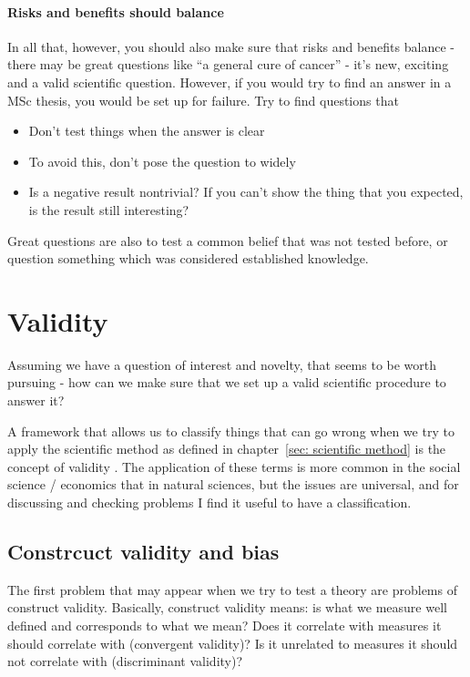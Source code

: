 \documentclass{tufte-book}
\begin{document}
\paragraph{Risks and benefits should balance} In all that, however, you should also make sure that risks and benefits balance - there may be great questions like ``a general cure of cancer'' - it's new, exciting and a valid scientific question. However, if you would try to find an answer in a MSc thesis, you would be set up for failure. Try to find questions that 

\begin{itemize}
\item Don’t test things when the answer is clear
\item To avoid this, don’t pose the question to widely
\item Is a negative result nontrivial? If you can’t show the thing that you expected, is the result still interesting?
\end{itemize}

Great questions are also to test a common belief that was not tested before, or question something which was considered established knowledge. 

\section{Validity}

Assuming we have a question of interest and novelty, that seems to be worth pursuing - how can we make sure that we set up a valid scientific procedure to answer it?


A framework that allows us to classify things that can go wrong when we try to apply the scientific method as defined in chapter~\ref{sec: scientific method} is the concept of validity \citep[][]{Shadish-Experimentalandquasi-2002}. The application of these terms is more common in the social science / economics that in natural sciences, but the issues are universal, and for discussing and checking problems I find it useful to have a classification. 

\subsection{Constrcuct validity and bias}

The first problem that may appear when we try to test a theory are problems of construct validity. Basically, construct validity means: is what we measure well defined and corresponds to what we mean? Does it correlate with measures it should correlate with (convergent validity)? Is it unrelated to measures it should not correlate with (discriminant validity)?
\end{document}
